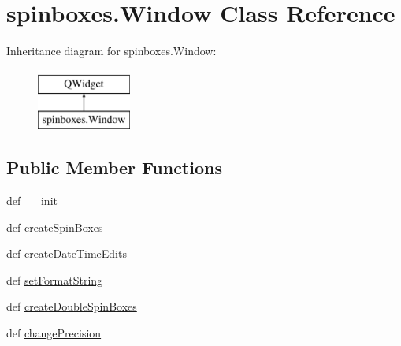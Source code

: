 \hypertarget{classspinboxes_1_1Window}{}\section{spinboxes.\+Window Class Reference}
\label{classspinboxes_1_1Window}
Inheritance diagram for spinboxes.\+Window\+:\begin{figure}[H]
\begin{center}
\leavevmode
\includegraphics[height=2.000000cm]{classspinboxes_1_1Window}
\end{center}
\end{figure}
\subsection*{Public Member Functions}
\begin{DoxyCompactItemize}
\item 
def \hyperlink{classspinboxes_1_1Window_aa30f3dbfe386925b097c17ba68eea51c}{\+\_\+\+\_\+init\+\_\+\+\_\+}
\item 
def \hyperlink{classspinboxes_1_1Window_a1aa833febc3314648480359c36ec546a}{create\+Spin\+Boxes}
\item 
def \hyperlink{classspinboxes_1_1Window_a6a7f1bc9f2f69b3b7a7257168f965f67}{create\+Date\+Time\+Edits}
\item 
def \hyperlink{classspinboxes_1_1Window_a31d028c4a5940ae58bb3ddb4e379ddd7}{set\+Format\+String}
\item 
def \hyperlink{classspinboxes_1_1Window_a56e325b6a0206a8990d7d5b942fa3c30}{create\+Double\+Spin\+Boxes}
\item 
def \hyperlink{classspinboxes_1_1Window_a0877386985dbd247d2cb9faaea1a8fbe}{change\+Precision}
\end{DoxyCompactItemize}
